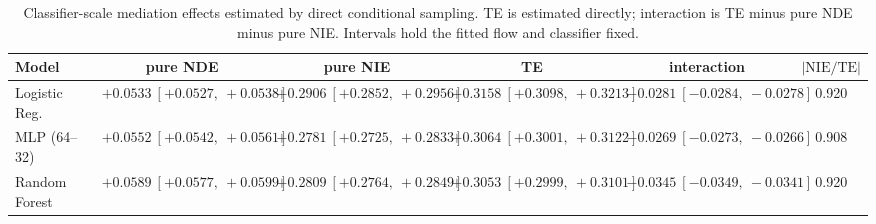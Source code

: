 \begin{table}[htbp]
  \centering
  \caption{Classifier-scale mediation effects estimated by direct conditional sampling. TE is estimated directly; interaction is TE minus pure NDE minus pure NIE. Intervals hold the fitted flow and classifier fixed.}
  \label{tab:german_synth_m2_gap_overall}
  \begin{tabular}{lccccc}
    \toprule
    Model & pure NDE & pure NIE & TE & interaction & $|\mathrm{NIE}/\mathrm{TE}|$ \\
    \midrule
    Logistic Reg. & $+0.0533\ [+0.0527,\ +0.0538]$ & $+0.2906\ [+0.2852,\ +0.2956]$ & $+0.3158\ [+0.3098,\ +0.3213]$ & $-0.0281\ [-0.0284,\ -0.0278]$ & 0.920 \\
    MLP (64--32) & $+0.0552\ [+0.0542,\ +0.0561]$ & $+0.2781\ [+0.2725,\ +0.2833]$ & $+0.3064\ [+0.3001,\ +0.3122]$ & $-0.0269\ [-0.0273,\ -0.0266]$ & 0.908 \\
    Random Forest & $+0.0589\ [+0.0577,\ +0.0599]$ & $+0.2809\ [+0.2764,\ +0.2849]$ & $+0.3053\ [+0.2999,\ +0.3101]$ & $-0.0345\ [-0.0349,\ -0.0341]$ & 0.920 \\
    \bottomrule
  \end{tabular}
\end{table}